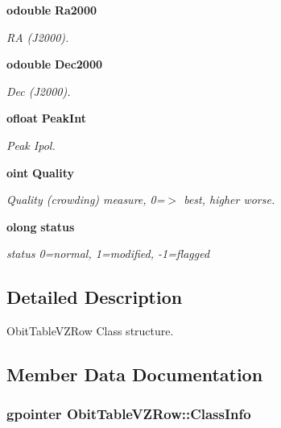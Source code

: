 \begin{CompactItemize}
{\bf odouble} {\bf Ra2000}
\begin{CompactList}\small\item\em RA (J2000). \item\end{CompactList}\item 
{\bf odouble} {\bf Dec2000}
\begin{CompactList}\small\item\em Dec (J2000). \item\end{CompactList}\item 
{\bf ofloat} {\bf Peak\-Int}
\begin{CompactList}\small\item\em Peak Ipol. \item\end{CompactList}\item 
{\bf oint} {\bf Quality}
\begin{CompactList}\small\item\em Quality (crowding) measure, 0=$>$ best, higher worse. \item\end{CompactList}\item 
{\bf olong} {\bf status}
\begin{CompactList}\small\item\em status 0=normal, 1=modified, -1=flagged \item\end{CompactList}\end{CompactItemize}


\subsection{Detailed Description}
Obit\-Table\-VZRow Class structure. 



\subsection{Member Data Documentation}
\subsubsection{\setlength{\rightskip}{0pt plus 5cm}gpointer {\bf Obit\-Table\-VZRow::Class\-Info}}\label{structObitTableVZRow_o1}


